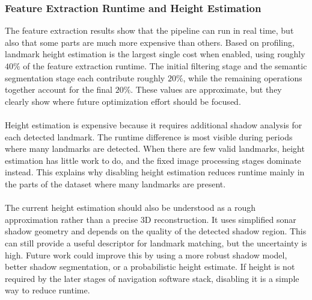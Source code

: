 \subsubsection{Feature Extraction Runtime and Height Estimation}
The feature extraction results show that the pipeline can run in real time, but also that some parts are much more expensive than others. Based on profiling, landmark height estimation is the largest single cost when enabled, using roughly $40\%$ of the feature extraction runtime. The initial filtering stage and the semantic segmentation stage each contribute roughly $20\%$, while the remaining operations together account for the final $20\%$. These values are approximate, but they clearly show where future optimization effort should be focused.
\\ \\
Height estimation is expensive because it requires additional shadow analysis for each detected landmark. The runtime difference is most visible during periods where many landmarks are detected. When there are few valid landmarks, height estimation has little work to do, and the fixed image processing stages dominate instead. This explains why disabling height estimation reduces runtime mainly in the parts of the dataset where many landmarks are present.
\\ \\
The current height estimation should also be understood as a rough approximation rather than a precise 3D reconstruction. It uses simplified sonar shadow geometry and depends on the quality of the detected shadow region. This can still provide a useful descriptor for landmark matching, but the uncertainty is high. Future work could improve this by using a more robust shadow model, better shadow segmentation, or a probabilistic height estimate. If height is not required by the later stages of navigation software stack, disabling it is a simple way to reduce runtime.

\newpage

